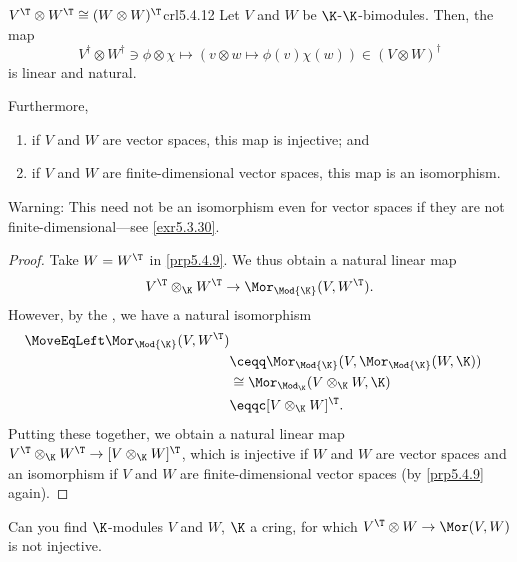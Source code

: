 \begin{crl}{$V^{\T}\otimes W^{\T}\cong (W\otimes W)^{\T}$}{crl5.4.12}
	Let $V$ and $W$ be $\K$-$\K$-bimodules.  Then, the map
	\begin{equation*}
		V^{\dagger}\otimes W^{\dagger}\ni \phi \otimes \chi \mapsto (v\otimes w\mapsto \phi (v)\chi (w))\in (V\otimes W)^{\dagger}
	\end{equation*}
	is linear and natural.
	
	Furthermore,
	\begin{enumerate}
		\item if $V$ and $W$ are vector spaces, this map is injective; and
		\item if $V$ and $W$ are finite-dimensional vector spaces, this map is an isomorphism.
	\end{enumerate}
	\begin{rmk}
		Warning:  This need not be an isomorphism even for vector spaces if they are not finite-dimensional---see \cref{exr5.3.30}.
	\end{rmk}
	\begin{proof}
		Take $W=W^{\T}$ in \cref{prp5.4.9}.  We thus obtain a natural linear map
		\begin{equation}
			V^{\T}\otimes _{\K}W^{\T}\rightarrow \Mor _{\Mod{\K}}(V,W^{\T}).
		\end{equation}
		However, by the , we have a natural isomorphism
		\begin{equation}
			\begin{split}
				\MoveEqLeft
				\Mor _{\Mod{\K}}(V,W^{\T}) \\
				& \ceqq \Mor _{\Mod{\K}}(V,\Mor _{\Mod{\K}}(W,\K )) \\
				& \cong \Mor _{\Mod _{\K}}(V\otimes _{\K}W,\K ) \\
				& \eqqc [V\otimes _{\K}W]^{\T}.
			\end{split}
		\end{equation}
		Putting these together, we obtain a natural linear map $V^{\T}\otimes _{\K}W^{\T}\rightarrow [V\otimes _{\K}W]^{\T}$, which is injective if $W$ and $W$ are vector spaces and an isomorphism if $V$ and $W$ are finite-dimensional vector spaces (by \cref{prp5.4.9} again).
	\end{proof}
\end{crl}
\begin{exr}{}{}
	Can you find $\K$-modules $V$ and $W$, $\K$ a cring, for which $V^{\T}\otimes W\rightarrow \Mor (V,W)$ is not injective.
\end{exr}
